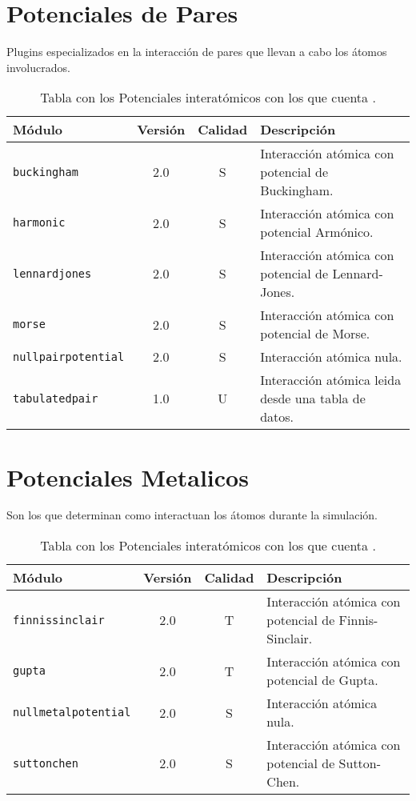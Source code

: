 \section{Potenciales de Pares}
Plugins especializados en la interacci\'on de pares que llevan a cabo los \'atomos involucrados.

\begin{table}[h!]
 \begin{tabular}{|l|c|c|p{10cm}|}\hline
 M\'odulo & Versi\'on & Calidad & Descripci\'on \\
 \hline\hline
 \texttt{buckingham} & 2.0 & S & Interacci\'on at\'omica con potencial de Buckingham.\\
 \hline
 \texttt{harmonic} & 2.0 & S & Interacci\'on at\'omica con potencial Arm\'onico.\\
 \hline
 \texttt{lennardjones} & 2.0 & S & Interacci\'on at\'omica con potencial de Lennard-Jones.\\
 \hline
 \texttt{morse} & 2.0 & S & Interacci\'on at\'omica con potencial de Morse.\\
 \hline
 \texttt{nullpairpotential} & 2.0 & S & Interacci\'on at\'omica nula.\\
 \hline
\texttt{tabulatedpair} & 1.0 & U & Interacci\'on at\'omica leida desde una tabla de datos.\\
 \hline
 \end{tabular}
\label{tab:modpotentials}
\caption{Tabla con los Potenciales interat\'omicos con los que cuenta {\lpmd}.}
\end{table}

\section{Potenciales Metalicos}
Son los que determinan como interactuan los \'atomos durante la simulaci\'on.

\begin{table}[h!]
 \begin{tabular}{|l|c|c|p{10cm}|}\hline
 M\'odulo & Versi\'on & Calidad & Descripci\'on \\
 \hline\hline
 \texttt{finnissinclair} & 2.0 & T & Interacci\'on at\'omica con potencial de Finnis-Sinclair.\\
 \hline
 \texttt{gupta} & 2.0 & T & Interacci\'on at\'omica con potencial de Gupta.\\
 \hline
 \texttt{nullmetalpotential} & 2.0 & S & Interacci\'on at\'omica nula.\\
 \hline
 \texttt{suttonchen} & 2.0 & S & Interacci\'on at\'omica con potencial de Sutton-Chen.\\
 \hline
 \end{tabular}
\label{tab:modpotentials}
\caption{Tabla con los Potenciales interat\'omicos con los que cuenta {\lpmd}.}
\end{table}


